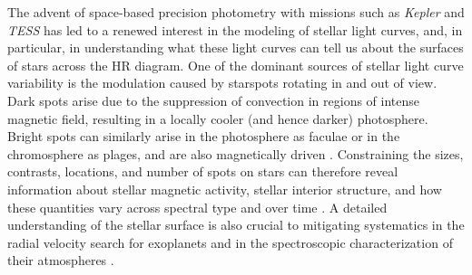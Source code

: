 \documentclass[modern]{aastex62}
\begin{document}
The advent of space-based precision photometry with missions such as
\emph{Kepler} \citep{Borucki2010} and \emph{TESS} \citep{Ricker2015}
has led to a renewed interest in the modeling of stellar light curves,
and, in particular, in understanding what these light curves can tell
us about the surfaces of stars across the HR diagram. One of the dominant
sources of stellar light curve variability is the modulation caused
by starspots rotating in and out of view.
Dark spots arise due to the suppression of convection in regions of
intense magnetic field, resulting in a locally cooler (and hence darker)
photosphere. Bright spots can similarly
arise in the photosphere as faculae or in the chromosphere as plages, and
are also magnetically driven \citep[e.g.,][]{Berdyugina2005}.
%
Constraining the sizes,
contrasts, locations, and number of spots on stars can therefore reveal
information about stellar magnetic activity, stellar interior structure,
and how these quantities vary across spectral type and over time
\citep[e.g.,][]{Garraffo2018}.
A detailed understanding of the stellar surface is also crucial to
mitigating systematics in the radial velocity search for exoplanets
\citep[e.g.,][]{Lanza2011} and in the spectroscopic characterization of their
atmospheres \citep[e.g.,][]{Rackham2018}.
\end{document}

